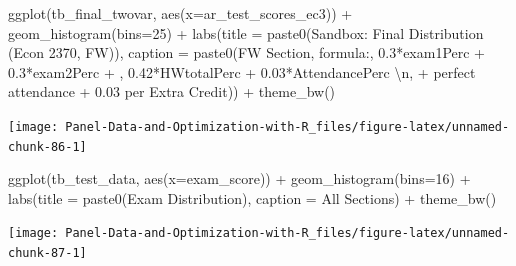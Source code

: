 \documentclass[
]{book}
\newenvironment{Shaded}{\begin{snugshade}}{\end{snugshade}}
\newcommand{\AttributeTok}[1]{\textcolor[rgb]{0.77,0.63,0.00}{#1}}
\newcommand{\DecValTok}[1]{\textcolor[rgb]{0.00,0.00,0.81}{#1}}
\newcommand{\FunctionTok}[1]{\textcolor[rgb]{0.00,0.00,0.00}{#1}}
\newcommand{\NormalTok}[1]{#1}
\newcommand{\SpecialCharTok}[1]{\textcolor[rgb]{0.00,0.00,0.00}{#1}}
\newcommand{\StringTok}[1]{\textcolor[rgb]{0.31,0.60,0.02}{#1}}
\begin{document}
\begin{Shaded}
\begin{Highlighting}[]
\FunctionTok{ggplot}\NormalTok{(tb\_final\_twovar, }\FunctionTok{aes}\NormalTok{(}\AttributeTok{x=}\NormalTok{ar\_test\_scores\_ec3)) }\SpecialCharTok{+}
  \FunctionTok{geom\_histogram}\NormalTok{(}\AttributeTok{bins=}\DecValTok{25}\NormalTok{) }\SpecialCharTok{+}
  \FunctionTok{labs}\NormalTok{(}\AttributeTok{title =} \FunctionTok{paste0}\NormalTok{(}\StringTok{\textquotesingle{}Sandbox: Final Distribution (Econ 2370, FW)\textquotesingle{}}\NormalTok{),}
       \AttributeTok{caption =} \FunctionTok{paste0}\NormalTok{(}\StringTok{\textquotesingle{}FW Section, formula:\textquotesingle{}}\NormalTok{,}
                        \StringTok{\textquotesingle{}0.3*exam1Perc + 0.3*exam2Perc + \textquotesingle{}}\NormalTok{,}
                        \StringTok{\textquotesingle{}0.42*HWtotalPerc + 0.03*AttendancePerc }\SpecialCharTok{\textbackslash{}n}\StringTok{\textquotesingle{}}\NormalTok{,}
                        \StringTok{\textquotesingle{}+ perfect attendance + 0.03 per Extra Credit\textquotesingle{}}\NormalTok{)) }\SpecialCharTok{+}
  \FunctionTok{theme\_bw}\NormalTok{()}
\end{Highlighting}
\end{Shaded}

\begin{center}\texttt{[image: Panel-Data-and-Optimization-with-R\_files/figure-latex/unnamed-chunk-86-1]} \end{center}

\begin{Shaded}
\begin{Highlighting}[]
\FunctionTok{ggplot}\NormalTok{(tb\_test\_data, }\FunctionTok{aes}\NormalTok{(}\AttributeTok{x=}\NormalTok{exam\_score)) }\SpecialCharTok{+}
  \FunctionTok{geom\_histogram}\NormalTok{(}\AttributeTok{bins=}\DecValTok{16}\NormalTok{) }\SpecialCharTok{+}
  \FunctionTok{labs}\NormalTok{(}\AttributeTok{title =} \FunctionTok{paste0}\NormalTok{(}\StringTok{\textquotesingle{}Exam Distribution\textquotesingle{}}\NormalTok{),}
       \AttributeTok{caption =} \StringTok{\textquotesingle{}All Sections\textquotesingle{}}\NormalTok{) }\SpecialCharTok{+}
  \FunctionTok{theme\_bw}\NormalTok{()}
\end{Highlighting}
\end{Shaded}

\begin{center}\texttt{[image: Panel-Data-and-Optimization-with-R\_files/figure-latex/unnamed-chunk-87-1]} \end{center}
\end{document}
